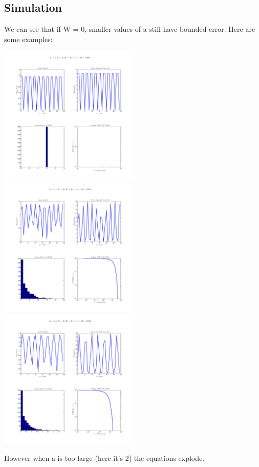 \documentclass[leqno,twocolumn]{article}
\begin{document}
{\subsection{Simulation}
We can see that if W = 0, smaller values of a still have bounded error. Here are some examples:

\includegraphics[width=0.5\textwidth]{udelay_0}
\includegraphics[width=0.5\textwidth]{udelay_1}\\
\includegraphics[width=0.5\textwidth]{udelay_2}


However when a is too large (here it's 2) the equations explode. 

}
\end{document}
